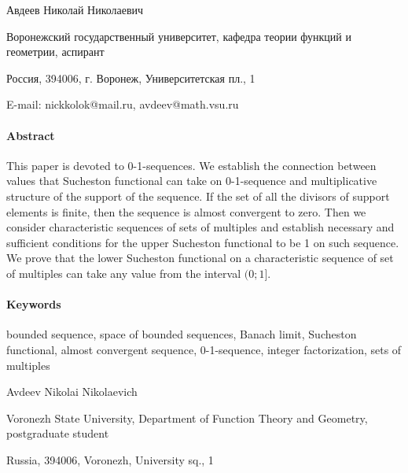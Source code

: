 \documentclass[a4paper,openbib]{article}
\theoremstyle{definition}
\begin{document}
Авдеев Николай Николаевич

Воронежский государственный университет, кафедра теории функций и геометрии, аспирант

Россия, 394006, г. Воронеж, Университетская пл., 1

E-mail: nickkolok@mail.ru, avdeev@math.vsu.ru


\paragraph{Abstract}

This paper is devoted to 0-1-sequences.
We establish the connection between values that Sucheston functional can take
on 0-1-sequence and multiplicative structure of the support of the sequence.
If the set of all the divisors of support elements is finite,
then the sequence is almost convergent to zero.
Then we consider characteristic sequences of sets of multiples
and establish necessary and sufficient conditions
for the upper Sucheston functional
to be 1 on such sequence.
We prove that the lower Sucheston functional
on a characteristic sequence of set of multiples can take any value from the interval $(0;1]$.

\paragraph{Keywords}
	bounded sequence,
	space of bounded sequences,
	Banach limit,
	Sucheston functional,
	almost convergent sequence,
	0-1-sequence,
	integer factorization,
	sets of multiples


Avdeev Nikolai Nikolaevich

Voronezh State University, Department of Function Theory and Geometry, postgraduate student

Russia, 394006, Voronezh, University sq., 1


\printbibliography{}
\end{document}
